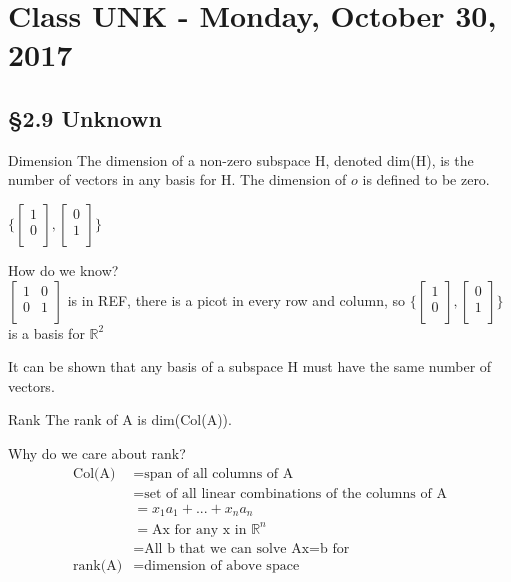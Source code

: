 \chapter{Class UNK - Monday, October 30, 2017}
\section{\S 2.9 Unknown}

\begin{imp:defn}{Dimension}{} The dimension of a non-zero subspace H, denoted dim(H), is the number of vectors in any basis for H. The dimension of ${o}$ is defined to be zero.
\end{imp:defn}
\begin{ex}
$\{ \begin{bmatrix}
1\\
0\\
\end{bmatrix}, \begin{bmatrix}
0\\
1\\
\end{bmatrix} \} $
\end{ex}
\begin{ex}
How do we know?\\
$\begin{bmatrix}
1 & 0\\
0 & 1\\
\end{bmatrix}$
is in REF, there is a picot in every row and column, so $\{ \begin{bmatrix}
1\\
0\\
\end{bmatrix}, \begin{bmatrix}
0\\
1\\
\end{bmatrix} \} $ is a basis for $\mathbb{R}^2$
\end{ex}
\begin{note}
It can be shown that any basis of a subspace H must have the same number of vectors.
\end{note}
\begin{imp:defn}{Rank}{} The rank of A is dim(Col(A)).
\end{imp:defn}
Why do we care about rank?\\
\begin{align*}
\text{Col(A)} &= \text{span of all columns of A}\\
&= \text{set of all linear combinations of the columns of A}\\
&= {x_1a_1+...+x_na_n}\\
&=\text{Ax for any x in } \mathbb{R}^n \\
&= \text{All b that we can solve Ax=b for}\\
\text{rank(A)}&=\text{dimension of above space}\\
\end{align*}
